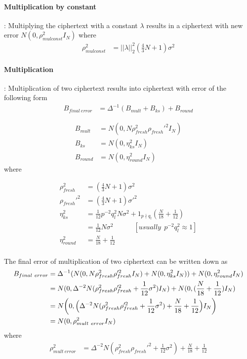 \documentclass[a4paper,10pt]{article}
\begin{document}
\paragraph{Multiplication by constant}: Multiplying the ciphertext with a constant $\lambda$ results in a ciphertext with new error $N(0,\rho_{mul const}^2I_N)$ where
\begin{align}
    \rho_{mul const}^2 &= ||\lambda||^2_2(\frac{4}{3}N+1)\sigma^2
\end{align}

\paragraph{Multiplication}: Multiplication of two ciphertext results into ciphertext with error of the following form
\begin{align}
    B_{final\ error} &= \Delta^{-1}(B_{mult}+B_{ks})+B_{round}
\end{align}

\begin{align*}
B_{mult} &= N(0,N\rho_{fresh}^2\rho_{fresh}'^2I_N) \\
  B_{ks} &= N(0,\eta_{ks}^2I_N) \\
  B_{round} &= N(0,\eta_{round}^2 I_N)
\end{align*}
where

\begin{align*}
\rho_{fresh}^2 &=(\frac{4}{3}N+1)\sigma^2 \\
\rho_{fresh}'^2 &=(\frac{4}{3}N+1)\sigma'^2 \\
\eta_{ks}^2     &=\frac{1}{12}p^{-2}q^2_{l}N\sigma^2+1_{p \nmid q_l}(\frac{N}{18}+\frac{1}{12}) \\
                &=\frac{1}{12} N\sigma^2 \hspace{3em}[usually\ \ p^{-2}q^2_{l}\approx 1]\\
\eta^2_{round}  &= \frac{N}{18} + \frac{1}{12}\\
\end{align*}

The final error of multiplication of two ciphertext can be written down as
\begin{align}
    B_{final\ error} &= \Delta^{-1}(N(0,N\rho_{fresh}^2\rho_{fresh}'^2I_N)+ N(0,\eta_{ks}^2I_N))+N(0,\eta_{round}^2 I_N) \nonumber \\
                     &= N(0,\Delta^{-2}N(\rho_{fresh}^2\rho_{fresh}'^2+\frac{1}{12}\sigma^2)I_N) + N(0,(\frac{N}{18}+\frac{1}{12})I_N) \nonumber \\
                     &= N \biggl(0,\Bigl(\Delta^{-2}N(\rho_{fresh}^2\rho_{fresh}'^2+\frac{1}{12}\sigma^2)+\frac{N}{18}+\frac{1}{12}\Bigr)I_N\biggl) \nonumber \\
                     &=N(0,\rho_{mult\ error}^2I_N)
\end{align}
where
\begin{align*}
\rho_{mult\ error}^2 &= \Delta^{-2}N(\rho_{fresh}^2\rho_{fresh}'^2+\frac{1}{12}\sigma^2)+\frac{N}{18}+\frac{1}{12}  \\
\end{align*}
\end{document}
